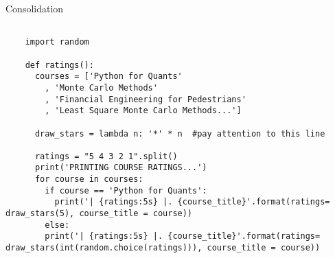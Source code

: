 \begin{frame}[fragile]{Consolidation}
  \begin{verbatim}

    import random
    
    def ratings():
      courses = ['Python for Quants'
        , 'Monte Carlo Methods'
        , 'Financial Engineering for Pedestrians'
        , 'Least Square Monte Carlo Methods...']
      
      draw_stars = lambda n: '*' * n  #pay attention to this line
      
      ratings = "5 4 3 2 1".split()
      print('PRINTING COURSE RATINGS...')
      for course in courses:
        if course == 'Python for Quants':
          print('| {ratings:5s} |. {course_title}'.format(ratings= draw_stars(5), course_title = course))
        else:
        print('| {ratings:5s} |. {course_title}'.format(ratings= draw_stars(int(random.choice(ratings))), course_title = course))
  \end{verbatim}
\end{frame}
